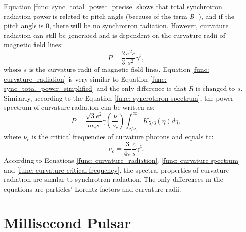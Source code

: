 \documentclass[a4paper, 12pt]{report}
\begin{document}
      Equation \ref{func: sync_total_power_precise} shows that total synchrotron radiation 
      power is related to pitch angle (because of the term $B_\perp$), and if the 
      pitch angle is $0$, there will be no synchrotron radiation. However, curvature 
      radiation can still be generated and is dependent on the curvature radii of 
      magnetic field lines:
      \begin{equation}
        \label{func: curvature_radiation}
        P = \frac{2}{3}\frac{e^2c}{s^2}\gamma^4 ,
      \end{equation}
      where $s$ is the curvature radii of magnetic field lines. 
      Equation \ref{func: curvature_radiation} is very similar to Equation 
      \ref{func: sync_total_power_simplified} and the only difference is that 
      $R$ is changed to $s$. Similarly, according to the Equation 
      \ref{func: syncrothron spectrum}, the power spectrum of curvature radiation can 
      be written as:
      \begin{equation}
        \label{func: curvature spectrum}
        P = \frac{\sqrt{3}e^2}{m_es}\gamma \left(\frac{\nu}{\nu_c}\right) \int_{\nu / \nu_c}^{\infty} K_{5/3}\left(\eta \right)d\eta ,
      \end{equation}
      where $\nu_c$ is the critical frequencies of curvature photons and equals to:
      \begin{equation}
        \label{func: curvature critical frequency}
        \nu_c = \frac{3}{4\pi}\frac{c}{s}\gamma^3 .
      \end{equation}
      According to Equations \ref{func: curvature_radiation}, \ref{func: curvature spectrum} 
      and \ref{func: curvature critical frequency}, the spectral properties of curvature 
      radiation are similar to synchrotron radiation. The only differences in the 
      equations are particles' Lorentz factors and curvature radii. 


  \section{Millisecond Pulsar} 
\end{document}

